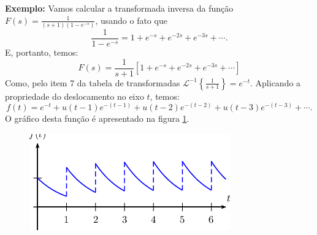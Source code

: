 \documentclass[a4paper,10pt]{book}
\begin{document}
 {\bf Exemplo:} Vamos calcular a transformada inversa da função $F(s)=\frac{1}{(s+1)(1-e^{-s})}$, usando o fato que
 \begin{equation}\frac{1}{1-e^{-s}}=1+e^{-s}+e^{-2s}+e^{-3s}+\cdots.\end{equation}
 E, portanto, temos:
  \begin{equation} F(s)= \frac{1}{s+1}\left[1+e^{-s}+e^{-2s}+e^{-3s}+\cdots \right]
  \end{equation}
  Como, pelo item 7 da tabela de transformadas $\mathcal{L}^{-1}\left\{\frac{1}{s+1}\right\}=e^{-t}.$
 Aplicando a propriedade do deslocamento no eixo $t$, temos:
  \begin{equation} f(t)= e^{-t}+ u(t-1) e^{-(t-1)}+ u(t-2) e^{-(t-2)}+ u(t-3) e^{-(t-3)}+\cdots.
  \end{equation}
 O gráfico desta função é apresentado na figura \ref{fig_exp_iterada}.
  \begin{figure}[!ht]
 \begin{center}
% 
 \includegraphics{figs/especiais_figura_6}\end{center}
 \caption{\label{fig_exp_iterada}}
 \end{figure}
\end{document}
